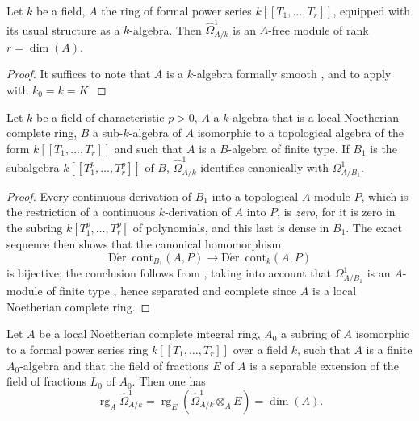 \begin{corollary}[21.9.3]
\label{0.21.9.3}
Let $k$ be a field, $A$ the ring of formal power series $k[[T_1,\ldots,T_r]]$, equipped with its usual structure as a $k$-algebra.
Then $\widehat{\Omega}^1_{A/k}$ is an $A$-free module of rank $r=\dim(A)$.
\end{corollary}

\begin{proof}
It suffices to note that $A$ is a $k$-algebra formally smooth , and to apply  with $k_0=k=K$.
\end{proof}

\begin{lemma}[21.9.4]
\label{0.21.9.4}
Let $k$ be a field of characteristic $p>0$, $A$ a $k$-algebra that is a local Noetherian complete ring, $B$ a sub-$k$-algebra of $A$ isomorphic to a topological algebra of the form $k[[T_1,\ldots,T_r]]$ and such that $A$ is a $B$-algebra of finite type.
If $B_1$ is the subalgebra $k[[T_1^p,\ldots,T_r^p]]$ of $B$, $\widehat{\Omega}^1_{A/k}$ identifies canonically with $\Omega^1_{A/B_1}$.
\end{lemma}

\begin{proof}
Every continuous derivation of $B_1$ into a topological $A$-module $P$, which is the restriction of a continuous $k$-derivation of $A$ into $P$, is \emph{zero}, for it is zero in the subring $k[T_1^p,\ldots,T_r^p]$ of polynomials, and this last is dense in $B_1$.
The exact sequence  then shows that the canonical homomorphism
\[
  \operatorname{D\acute{e}r.\ cont}_{B_1}(A,P)\to\operatorname{D\acute{e}r.\ cont}_k(A,P)
\]
is bijective; the conclusion follows from , taking into account that $\Omega^1_{A/B_1}$ is an $A$-module of finite type , hence separated and complete since $A$ is a local Noetherian complete ring.
\end{proof}

\begin{proposition}[21.9.5]
\label{0.21.9.5}
Let $A$ be a local Noetherian complete integral ring, $A_0$ a subring of $A$ isomorphic to a formal power series ring $k[[T_1,\ldots,T_r]]$ over a field $k$, such that $A$ is a finite $A_0$-algebra and that the field of fractions $E$ of $A$ is a separable extension of the field of fractions $L_0$ of $A_0$.
Then one has
\begin{equation}
\tag{21.9.5.1}
  \label{0.21.9.5.1}
  \operatorname{rg}_A\widehat{\Omega}^1_{A/k}=\operatorname{rg}_E(\widehat{\Omega}^1_{A/k}\otimes_A E)=\dim(A).
\end{equation}
\end{proposition}

